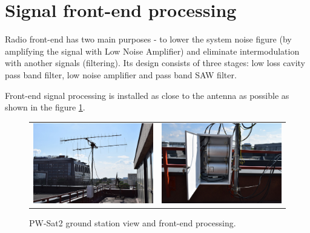 \section{Signal front-end processing}
Radio front-end has two main purposes - to lower the system noise figure (by amplifying the signal with Low Noise Amplifier) and eliminate intermodulation with another signals (filtering). Its design consists of three stages: low loss cavity pass band filter, low noise amplifier and pass band SAW filter. 

Front-end signal processing is installed as close to the antenna as possible as shown in the figure \ref{elka_skrzynka}.

\begin{figure}
   \centering
\begin{tabular}{cc}
        \includegraphics[width=0.3\paperwidth]{img/7/elka_view.jpg}
    & 
        \includegraphics[width=0.3\paperwidth]{img/7/elka_skrzynka.jpg}
\end{tabular}
\label{elka_skrzynka}
\caption{PW-Sat2 ground station view and front-end processing.}
\end{figure}

